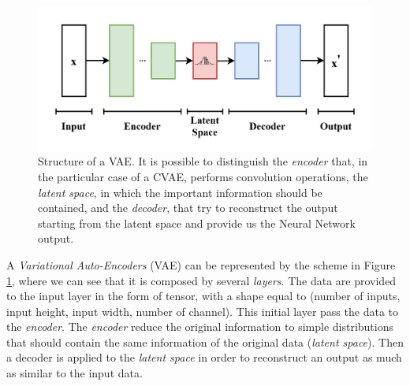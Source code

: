 \documentclass[12pt,a4paper,twocolumn]{article}
\begin{document}
			\begin{figure}[h!] 
				\centering
				\includegraphics[width=1\linewidth]{images/VAE_Basic}
				\caption{Structure of a VAE. It is possible to distinguish the \emph{encoder} that, in the particular case of a CVAE, performs convolution operations, the \emph{ latent space}, in which the important information should be contained, and the \emph{decoder}, that try to reconstruct the output starting from the latent space and provide us the Neural Network output.}
				\label{fig:vaebasic}
			\end{figure}
			A \emph{Variational Auto-Encoders} (VAE) can be represented by the scheme in Figure \ref{fig:vaebasic}, where we can see that it is composed by several \emph{layers}. The data are provided to the input layer in the form of tensor, with a shape equal to (number of inputs, input height, input width, number of channel). This initial layer pass the data to the \emph{encoder}. The \emph{encoder} reduce the original information to simple distributions that should contain the same information of the original data (\emph{latent space}). Then a decoder is applied to the \emph{latent space} in order to reconstruct an output as much as similar to the input data.
			
\end{document}
